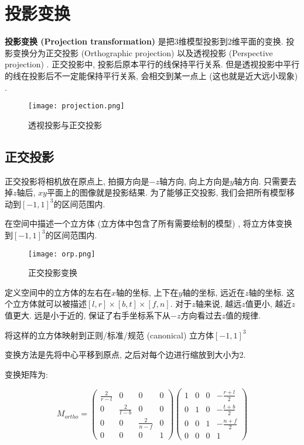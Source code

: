 \section{投影变换}

\textbf{投影变换 (Projection transformation) }是把$3$维模型投影到$2$维平面的变换. 投影变换分为正交投影 (Orthographic projection) 以及透视投影 (Perspective projection) . 正交投影中, 投影后原本平行的线保持平行关系. 但是透视投影中平行的线在投影后不一定能保持平行关系, 会相交到某一点上 (这也就是近大远小现象) . 

\begin{figure}[H]
	\centering
	\texttt{[image: projection.png]}
	\caption{透视投影与正交投影}
\end{figure}

\subsection{正交投影}

正交投影将相机放在原点上, 拍摄方向是$-z$轴方向, 向上方向是$y$轴方向. 只需要去掉$z$轴后, $xy$平面上的图像就是投影结果. 为了能够正交投影, 我们会把所有模型移动到$[-1,1]^3$的区间范围内. 

在空间中描述一个立方体 (立方体中包含了所有需要绘制的模型) , 将立方体变换到$[-1,1]^3$的区间范围内. 

\begin{figure}[H]
	\centering
	\texttt{[image: orp.png]}
	\caption{正交投影变换}
\end{figure}

定义空间中的立方体的左右在$x$轴的坐标, 上下在$y$轴的坐标, 远近在$z$轴的坐标. 这个立方体就可以被描述$[l,r]\times[b,t]\times[f,n]$. 对于$z$轴来说, 越远$z$值更小, 越近$z$值更大. 远是小于近的, 保证了右手坐标系下从$-z$方向看过去$z$值的规律. 

将这样的立方体映射到正则/标准/规范 (canonical) 立方体$[-1,1]^3$

变换方法是先将中心平移到原点, 之后对每个边进行缩放到大小为2. 

变换矩阵为: 

\begin{equation}
	M_{ortho}=\begin{pmatrix}\frac{2}{r-l}&0&0&0\\0&\frac{2}{t-b}&0&0\\0&0&\frac{2}{n-f}&0\\0&0&0&1\end{pmatrix}\begin{pmatrix}1&0&0&-\frac{r+l}{2}\\0&1&0&-\frac{t+b}{2}\\0&0&1&-\frac{n+f}{2}\\0&0&0&1\end{pmatrix}
\end{equation}

